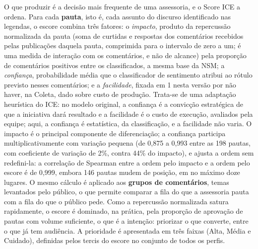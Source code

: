 O que produzir é a decisão mais frequente de uma assessoria, e o Score ICE a ordena. Para cada \textbf{pauta}, isto é, cada assunto do discurso identificado nas legendas, o escore combina três fatores: o \emph{impacto}, produto da repercussão normalizada da pauta (soma de curtidas e respostas dos comentários recebidos pelas publicações daquela pauta, comprimida para o intervalo de zero a um; é uma medida de interação com os comentários, e não de alcance) pela proporção de comentários positivos entre os classificados, a mesma base da NSM; a \emph{confiança}, probabilidade média que o classificador de sentimento atribui ao rótulo previsto nesses comentários; e a \emph{facilidade}, fixada em 1 nesta versão por não haver, na Coleta, dado sobre custo de produção. Trata-se de uma adaptação heurística do ICE: no modelo original, a confiança é a convicção estratégica de que a iniciativa dará resultado e a facilidade é o custo de execução, avaliados pela equipe; aqui, a confiança é estatística, da classificação, e a facilidade não varia. O impacto é o principal componente de diferenciação; a confiança participa multiplicativamente com variação pequena (de 0,875 a 0,993 entre as 198 pautas, com coeficiente de variação de 2\%, contra 44\% do impacto), e ajusta a ordem sem redefini-la: a correlação de Spearman entre a ordem pelo impacto e a ordem pelo escore é de 0,999, embora 146 pautas mudem de posição, em no máximo doze lugares. O mesmo cálculo é aplicado aos \textbf{grupos de comentários}, temas levantados pelo público, o que permite comparar a fila do que a assessoria pauta com a fila do que o público pede. Como a repercussão normalizada satura rapidamente, o escore é dominado, na prática, pela proporção de aprovação de pautas com volume suficiente, o que é a intenção: priorizar o que converte, entre o que já tem audiência. A prioridade é apresentada em três faixas (Alta, Média e Cuidado), definidas pelos tercis do escore no conjunto de todos os perfis.

